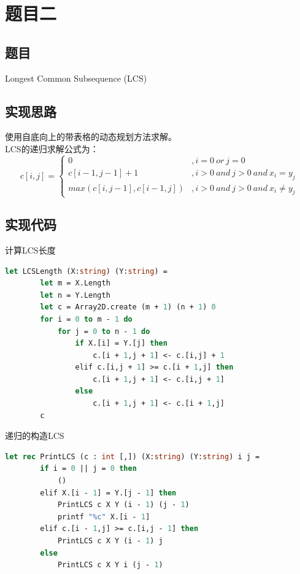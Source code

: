 \documentclass[a4paper]{article}
\begin{document}
\section{题目二}

\subsection{题目}

Longest Common Subsequence (LCS)

\subsection{实现思路}
使用自底向上的带表格的动态规划方法求解。\\
LCS的递归求解公式为：
\[c[i,j]=
    \left\{
        \begin{array}{ll}
            0 & ,i=0\ or\ j=0\\
            c[i-1,j-1]+1 & ,i>0\ and \ j>0\ and \ x_{i}=y_{j}\\
            max(c[i,j-1],c[i-1,j]) & ,i>0\ and \ j>0\ and \ x_{i} \neq y_{j}
        \end{array}
    \right.
\]
\subsection{实现代码}

计算LCS长度

\begin{lstlisting}[language=ML]
    let LCSLength (X:string) (Y:string) = 
        let m = X.Length
        let n = Y.Length
        let c = Array2D.create (m + 1) (n + 1) 0
        for i = 0 to m - 1 do
            for j = 0 to n - 1 do
                if X.[i] = Y.[j] then 
                    c.[i + 1,j + 1] <- c.[i,j] + 1
                elif c.[i,j + 1] >= c.[i + 1,j] then
                    c.[i + 1,j + 1] <- c.[i,j + 1]
                else
                    c.[i + 1,j + 1] <- c.[i + 1,j]
        c
\end{lstlisting}

递归的构造LCS

\begin{lstlisting}[language=ML]
    let rec PrintLCS (c : int [,]) (X:string) (Y:string) i j =
        if i = 0 || j = 0 then
            ()
        elif X.[i - 1] = Y.[j - 1] then 
            PrintLCS c X Y (i - 1) (j - 1)
            printf "%c" X.[i - 1]
        elif c.[i - 1,j] >= c.[i,j - 1] then
            PrintLCS c X Y (i - 1) j
        else
            PrintLCS c X Y i (j - 1)
\end{lstlisting}
\end{document}
